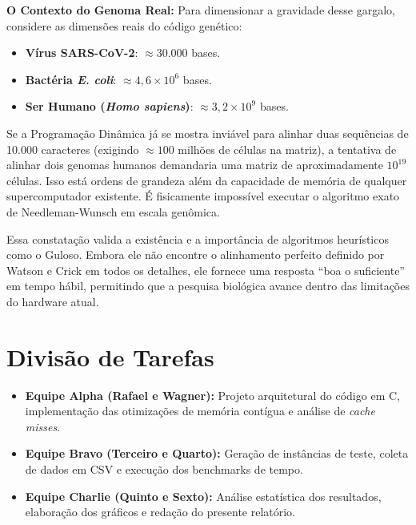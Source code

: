 \documentclass[12pt]{article}
\begin{document}
\textbf{O Contexto do Genoma Real:}
Para dimensionar a gravidade desse gargalo, considere as dimensões reais do código genético:
\begin{itemize}
    \item \textbf{Vírus SARS-CoV-2}: $\approx 30.000$ bases.
    \item \textbf{Bactéria \textit{E. coli}}: $\approx 4,6 \times 10^6$ bases.
    \item \textbf{Ser Humano (\textit{Homo sapiens})}: $\approx 3,2 \times 10^9$ bases.
\end{itemize}

Se a Programação Dinâmica já se mostra inviável para alinhar duas sequências de 10.000 caracteres (exigindo $\approx 100$ milhões de células na matriz), a tentativa de alinhar dois genomas humanos demandaria uma matriz de aproximadamente $10^{19}$ células. Isso está ordens de grandeza além da capacidade de memória de qualquer supercomputador existente. É fisicamente impossível executar o algoritmo exato de Needleman-Wunsch em escala genômica.

Essa constatação valida a existência e a importância de algoritmos heurísticos como o Guloso. Embora ele não encontre o alinhamento perfeito definido por Watson e Crick em todos os detalhes, ele fornece uma resposta ``boa o suficiente'' em tempo hábil, permitindo que a pesquisa biológica avance dentro das limitações do hardware atual.

\section{Divisão de Tarefas}
\begin{itemize}
    \item \textbf{Equipe Alpha (Rafael e Wagner):} Projeto arquitetural do código em C, implementação das otimizações de memória contígua e análise de \textit{cache misses}.
    \item \textbf{Equipe Bravo (Terceiro e Quarto):} Geração de instâncias de teste, coleta de dados em CSV e execução dos benchmarks de tempo.
    \item \textbf{Equipe Charlie (Quinto e Sexto):} Análise estatística dos resultados, elaboração dos gráficos e redação do presente relatório.
\end{itemize}
\end{document}

